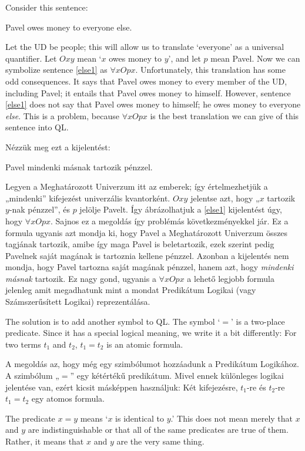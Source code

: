 Consider this sentence:
\begin{earg}
\item[\ex{else1}] Pavel owes money to everyone else.
\end{earg}
Let the UD be people; this will allow us to translate `everyone' as a universal quantifier. Let $Oxy$ mean `$x$ owes money to $y$', and let $p$ mean Pavel. Now we can symbolize sentence \ref{else1} as $\forall x Opx$. Unfortunately, this translation has some odd consequences. It says that Pavel owes money to every member of the UD, including Pavel; it entails that Pavel owes money to himself. However, sentence \ref{else1} does not say that Pavel owes money to himself; he owes money to everyone \emph{else}. This is a problem, because $\forall x Opx$ is the best translation we can give of this sentence into QL.

Nézzük meg ezt a kijelentést:
\begin{earg}
\item[\ex{else1}] Pavel mindenki másnak tartozik pénzzel.
\end{earg}
Legyen a Meghatározott Univerzum itt az emberek; így értelmezhetjük a „mindenki” kifejezést univerzális kvantorként. $Oxy$ jelentse azt, hogy „$x$ tartozik $y$-nak pénzzel”, és $p$ jelölje Pavelt. Így ábrázolhatjuk a \ref{else1} kijelentést úgy, hogy $\forall x Opx$. Sajnos ez a megoldás így problémás következményekkel jár. Ez a formula ugyanis azt mondja ki, hogy Pavel a Meghatározott Univerzum összes tagjának tartozik, amibe így maga Pavel is beletartozik, ezek szerint pedig Pavelnek saját magának is tartoznia kellene pénzzel. Azonban a kijelentés nem mondja, hogy Pavel tartozna saját magának pénzzel, hanem azt, hogy \emph{mindenki másnak} tartozik. Ez nagy gond, ugyanis a $\forall x Opx$ a lehető legjobb formula jelenleg amit megadhatunk mint a mondat Predikátum Logikai (vagy Számszerűsített Logikai) reprezentálása.

The solution is to add another symbol to QL. The symbol `$=$' is a two-place predicate. Since it has a special logical meaning, we write it a bit differently: For two terms $t_1$ and $t_2$, $t_1=t_2$ is an atomic formula.

A megoldás az, hogy még egy szimbólumot hozzáadunk a Predikátum Logikához. A szimbólum „$=$” egy kétértékű predikátum. Mivel ennek különleges logikai jelentése van, ezért kicsit másképpen használjuk: Két kifejezésre, $t_1$-re és $t_2$-re $t_1=t_2$ egy atomos formula.

The predicate $x=y$ means `$x$ is identical to $y$.' This does not mean merely that $x$ and $y$ are indistinguishable or that all of the same predicates are true of them. Rather, it means that $x$ and $y$ are the very same thing.

